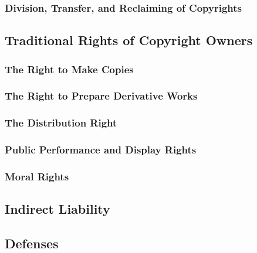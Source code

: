 
\subsubsection{Division, Transfer, and Reclaiming of Copyrights}


\subsection{Traditional Rights of Copyright Owners}


\subsubsection{The Right to Make Copies}


\subsubsection{The Right to Prepare Derivative Works}


\subsubsection{The Distribution Right}


\subsubsection{Public Performance and Display Rights}


\subsubsection{Moral Rights}


\subsection{Indirect Liability}


\subsection{Defenses}

